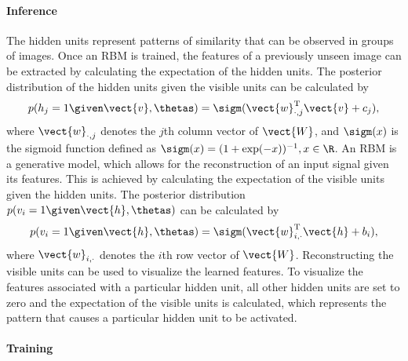 \paragraph{Inference}
The hidden units represent patterns of similarity that can be observed in groups
of images. Once an RBM is trained, the features of a previously unseen image can
be extracted by calculating the expectation of the hidden units. The posterior
distribution of the hidden units given the visible units can be calculated by
\begin{equation}
\label{eq:dhgivenv}
p(h_j = 1 \given \vect{v}, \thetas) = \sigm(\vect{w}_{\cdot,j}^\text{T}\vect{v}
+ c_j),
\end{equation}
where $\vect{w}_{\cdot,j}$ denotes the $j$th column vector of $\vect{W}$, and
$\sigm(x)$ is the sigmoid function defined as $\sigm(x) = (1+ \exp(-x))^{-1}, x
\in \R$. An RBM is a generative model, which allows for the reconstruction of
an input signal given its features. This is achieved by calculating the expectation
of the visible units given the hidden units. The posterior distribution $p(v_i =
1 \given \vect{h}, \thetas)$ can be calculated by
\begin{equation}
\label{eq:dvgivenh}
p(v_i = 1 \given \vect{h}, \thetas) = \sigm(\vect{w}_{i,
\cdot}^\text{T}\vect{h} + b_i),
\end{equation}
where $\vect{w}_{i,\cdot}$ denotes the $i$th row vector of $\vect{W}$.
Reconstructing the visible units can be used to visualize the learned features.
To visualize the features associated with a particular hidden unit, all other
hidden units are set to zero and the expectation of the visible units is
calculated, which represents the pattern that causes a particular hidden
unit to be activated.

\paragraph{Training}


